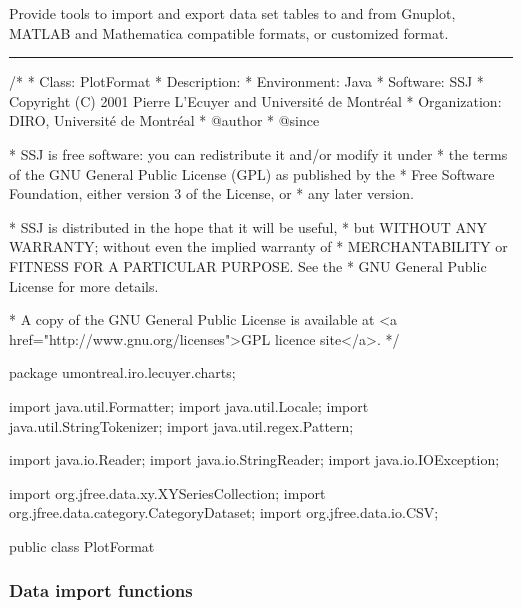 
Provide tools to import and export data set tables
to and from Gnuplot, MATLAB and Mathematica compatible
formats, or customized format.

\bigskip\hrule
\begin{code}
\begin{hide}
/*
 * Class:        PlotFormat
 * Description:  
 * Environment:  Java
 * Software:     SSJ 
 * Copyright (C) 2001  Pierre L'Ecuyer and Université de Montréal
 * Organization: DIRO, Université de Montréal
 * @author       
 * @since

 * SSJ is free software: you can redistribute it and/or modify it under
 * the terms of the GNU General Public License (GPL) as published by the
 * Free Software Foundation, either version 3 of the License, or
 * any later version.

 * SSJ is distributed in the hope that it will be useful,
 * but WITHOUT ANY WARRANTY; without even the implied warranty of
 * MERCHANTABILITY or FITNESS FOR A PARTICULAR PURPOSE.  See the
 * GNU General Public License for more details.

 * A copy of the GNU General Public License is available at
   <a href="http://www.gnu.org/licenses">GPL licence site</a>.
 */
\end{hide}
package umontreal.iro.lecuyer.charts;\begin{hide}

import   java.util.Formatter;
import   java.util.Locale;
import   java.util.StringTokenizer;
import   java.util.regex.Pattern;

import   java.io.Reader;
import   java.io.StringReader;
import   java.io.IOException;

import   org.jfree.data.xy.XYSeriesCollection;
import   org.jfree.data.category.CategoryDataset;
import   org.jfree.data.io.CSV;\end{hide}

public class PlotFormat\begin{hide} {
   private PlotFormat() {}\end{hide}
\end{code}

\subsubsection*{Data import functions}

